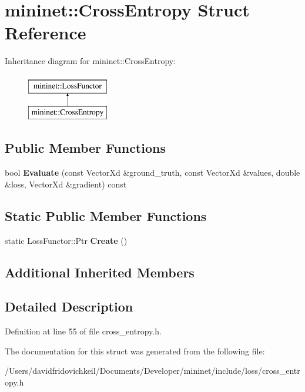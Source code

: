 \hypertarget{structmininet_1_1_cross_entropy}{}\section{mininet\+:\+:Cross\+Entropy Struct Reference}
\label{structmininet_1_1_cross_entropy}
Inheritance diagram for mininet\+:\+:Cross\+Entropy\+:\begin{figure}[H]
\begin{center}
\leavevmode
\includegraphics[height=2.000000cm]{structmininet_1_1_cross_entropy}
\end{center}
\end{figure}
\subsection*{Public Member Functions}
\begin{DoxyCompactItemize}
\item 
\hypertarget{structmininet_1_1_cross_entropy_af0d203db733d96a1c7eb4c6d0f7d51e5}{}\label{structmininet_1_1_cross_entropy_af0d203db733d96a1c7eb4c6d0f7d51e5} 
bool {\bfseries Evaluate} (const Vector\+Xd \&ground\+\_\+truth, const Vector\+Xd \&values, double \&loss, Vector\+Xd \&gradient) const
\end{DoxyCompactItemize}
\subsection*{Static Public Member Functions}
\begin{DoxyCompactItemize}
\item 
\hypertarget{structmininet_1_1_cross_entropy_ae736386755ec56b1adfaf643b1d114fa}{}\label{structmininet_1_1_cross_entropy_ae736386755ec56b1adfaf643b1d114fa} 
static Loss\+Functor\+::\+Ptr {\bfseries Create} ()
\end{DoxyCompactItemize}
\subsection*{Additional Inherited Members}


\subsection{Detailed Description}


Definition at line 55 of file cross\+\_\+entropy.\+h.



The documentation for this struct was generated from the following file\+:\begin{DoxyCompactItemize}
\item 
/\+Users/davidfridovichkeil/\+Documents/\+Developer/mininet/include/loss/cross\+\_\+entropy.\+h\end{DoxyCompactItemize}
